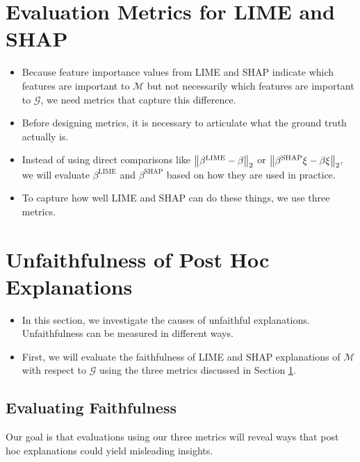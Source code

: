\documentclass[mnsc,blindrev]{informs3}
\begin{document}
\section{Evaluation Metrics for LIME and SHAP}
    \label{sec:evaluation_metrics}
    \begin{itemize}
    \item Because feature importance values from LIME and SHAP indicate which features are important to $\mathcal{M}$ but not necessarily which features are important to $\mathcal{G}$, we need metrics that capture this difference.
    
    \item Before designing metrics, it is necessary to articulate what the ground truth actually is. 
            
    \item Instead of using direct comparisons like $\norm{\beta^{\text{LIME}} - \beta}_2$ or $\norm{\beta^{\text{SHAP}} \xi - \beta \xi}_2$, we will evaluate $\beta^{\text{LIME}}$ and $\beta^{\text{SHAP}}$ based on how they are used in practice. 
    
    \item To capture how well LIME and SHAP can do these things, we use three metrics. 
    \end{itemize}

\section{Unfaithfulness of Post Hoc Explanations}
    \label{sec:unfaithfulness}
    \begin{itemize}
    \item In this section, we investigate the causes of unfaithful explanations. Unfaithfulness can be measured in different ways. 
    
    \item First, we will evaluate the faithfulness of LIME and SHAP explanations of $\mathcal{M}$ with respect to $\mathcal{G}$ using the three metrics discussed in Section \ref{sec:evaluation_metrics}. 
    \end{itemize}

    \subsection{Evaluating Faithfulness}
        \label{sec:evaluating_faithfulness}
         Our goal is that evaluations using our three metrics will reveal ways that post hoc explanations could yield misleading insights.
\end{document}
